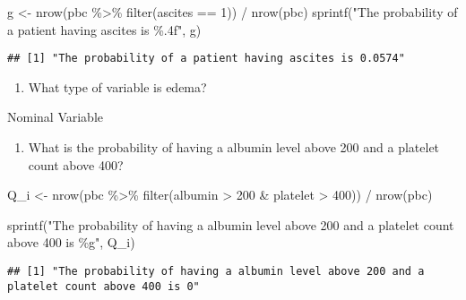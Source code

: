 \documentclass[
]{article}
\newenvironment{Shaded}{\begin{snugshade}}{\end{snugshade}}
\newcommand{\DecValTok}[1]{\textcolor[rgb]{0.00,0.00,0.81}{#1}}
\newcommand{\FunctionTok}[1]{\textcolor[rgb]{0.00,0.00,0.00}{#1}}
\newcommand{\NormalTok}[1]{#1}
\newcommand{\OtherTok}[1]{\textcolor[rgb]{0.56,0.35,0.01}{#1}}
\newcommand{\SpecialCharTok}[1]{\textcolor[rgb]{0.00,0.00,0.00}{#1}}
\newcommand{\StringTok}[1]{\textcolor[rgb]{0.31,0.60,0.02}{#1}}
\providecommand{\tightlist}{%
  \setlength{\itemsep}{0pt}\setlength{\parskip}{0pt}}
\begin{document}
\begin{Shaded}
\begin{Highlighting}[]
\NormalTok{g }\OtherTok{\textless{}{-}} \FunctionTok{nrow}\NormalTok{(pbc }\SpecialCharTok{\%\textgreater{}\%}
       \FunctionTok{filter}\NormalTok{(ascites }\SpecialCharTok{==} \DecValTok{1}\NormalTok{)) }\SpecialCharTok{/} 
  \FunctionTok{nrow}\NormalTok{(pbc)}
\FunctionTok{sprintf}\NormalTok{(}\StringTok{"The probability of a patient having ascites is \%.4f"}\NormalTok{, g)}
\end{Highlighting}
\end{Shaded}

\begin{verbatim}
## [1] "The probability of a patient having ascites is 0.0574"
\end{verbatim}

\begin{enumerate}
\def\labelenumi{\alph{enumi})}
\setcounter{enumi}{7}
\tightlist
\item
  What type of variable is edema?
\end{enumerate}

Nominal Variable

\begin{enumerate}
\def\labelenumi{\roman{enumi})}
\tightlist
\item
  What is the probability of having a albumin level above 200 and a
  platelet count above 400?
\end{enumerate}

\begin{Shaded}
\begin{Highlighting}[]
\NormalTok{Q\_i }\OtherTok{\textless{}{-}} \FunctionTok{nrow}\NormalTok{(pbc }\SpecialCharTok{\%\textgreater{}\%}
              \FunctionTok{filter}\NormalTok{(albumin }\SpecialCharTok{\textgreater{}} \DecValTok{200} \SpecialCharTok{\&}\NormalTok{ platelet }\SpecialCharTok{\textgreater{}} \DecValTok{400}\NormalTok{)) }\SpecialCharTok{/} 
  \FunctionTok{nrow}\NormalTok{(pbc)}

\FunctionTok{sprintf}\NormalTok{(}\StringTok{"The probability of having a albumin level above 200 and a platelet count above 400 is \%g"}\NormalTok{, Q\_i)}
\end{Highlighting}
\end{Shaded}

\begin{verbatim}
## [1] "The probability of having a albumin level above 200 and a platelet count above 400 is 0"
\end{verbatim}
\end{document}
